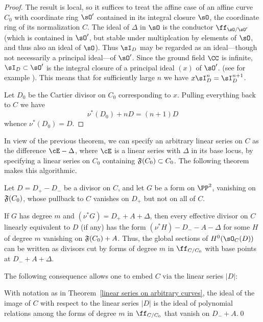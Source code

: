 \begin{proof}
The result is local, so it suffices to treat the affine case of an affine curve $C_{0}$ with coordinate
ring $\sO'$ contained
in its integral closure $\sO$, the coordinate ring of its normalization $C$.
The ideal of $\Delta$ in $\sO$ is the conductor $\ff_{\sO/{\sO'}}$ (which is contained in $\sO'$, but stable under
multiplcation by elements of $\sO$, and thus also an ideal of $\sO$). 
Thus $\sI_{D}$ may be regarded as an ideal---though not necessarily a principal ideal---of $\sO'$. Since the  ground field $\CC$ is infinite, $\sI_{D}\subset \sO'$ is the integral closure of a principal ideal $(x)$
of $\sO'$.
(see for example \cite[Chapter 8]{Swanson-Huneke}).
This means that for sufficiently large $n$ we have $x\sI_{D}^{n} = \sI_{D}^{n+1}$.

Let $D_{0}$ be the Cartier divisor on $C_{0}$ corresponding to $x$. Pulling everything back to $C$
we have 
$$
\nu^*(D_{0})+nD = (n+1)D
$$
whence $\nu^*(D_{0}) = D$.
 \end{proof}

In view of the previous theorem, we can specify an arbitrary linear series on $C$
as the difference $\cE - \Delta$, where $\cE$ is a linear series with $\Delta$ in its base locus, by specifying a
linear series on $C_0$ containing  $\adj(C_{0})\subset C_{0}$. The following theorem makes
this algorithmic.

\begin{theorem}\label{linear series on arbitrary curves}
Let $D = D_{+}-D_{-}$ be a divisor on $C$, and let $G$ be a form on $\PP^{2}$,
vanishing on $\adj(C_{0})$, whose pullback to $C$
vanishes on $D_{+}$ but not on all of $C$. 

If $G$ has degree $m$ and $(\nu^{*}G) = D_{+}+A+\Delta$, then every effective divisor on
$C$ linearly equivalent to $D$ (if any) has the form $(\nu^*H)-D_{-}-A-\Delta$ for some $H$ of degree $m$
 vanishing on $\adj(C_{0})+A$. Thus, the global sections of $H^{0}(\sO_{C}(D))$ can be written
as divisors cut by forms of degree $m$ in $\ff_{C/C_{0}}$ with base points at $D_{-}+A+\Delta$.
\end{theorem}

The following consequence allows one to embed $C$ via the linear series $|D|$:

\begin{corollary}
With notation as in Theorem~\ref{linear series on arbitrary curves}, the ideal of the image of
$C$ with respect to the linear series $|D|$ is the ideal of polynomial relations among the forms
of degree $m$ in $\ff_{C/C_{0}}$ that vanish on $D_{-}+A$.\qed
\end{corollary}

